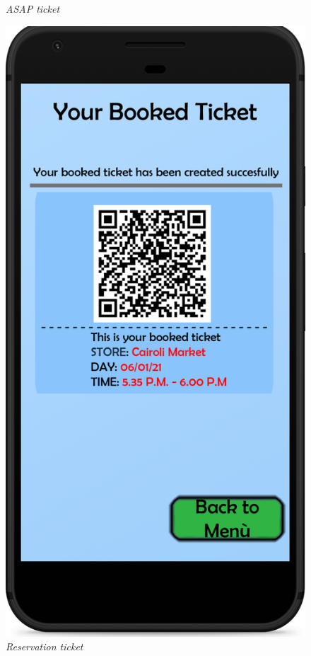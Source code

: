 \documentclass{article}
\begin{document}
\begin{figure}[!h]
\begin{minipage}[!h]{0.4\textwidth}
				\caption{\emph{ASAP ticket}}
			\end{minipage}
			\hfill
			\begin{minipage}[!h]{0.4\textwidth}
				\includegraphics[width=\textwidth]{../Mockups/BookedTicket.png}
				\caption{\emph{Reservation ticket}}
			\end{minipage}
		\end{figure}
	
\end{document}
